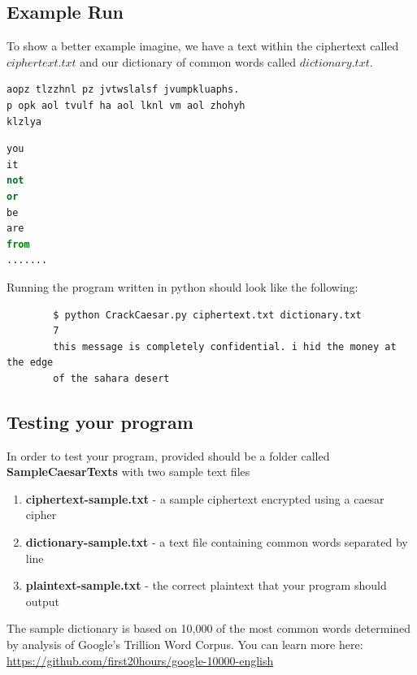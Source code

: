 \documentclass{article}
\begin{document}
\subsection{Example Run}
To show a better example imagine, we have a text within the ciphertext called $ciphertext.txt$ and our dictionary of common words called $dictionary.txt$.

\begin{file}
\begin{lstlisting}[language=Python]
aopz tlzzhnl pz jvtwslalsf jvumpkluaphs.
p opk aol tvulf ha aol lknl vm aol zhohyh
klzlya
\end{lstlisting}
\end{file}

\begin{file}
\begin{lstlisting}[language=Python]
you
it
not
or
be
are
from
.......
\end{lstlisting}
\end{file}

Running the program written in python should look like the following:

\begin{commandline}
	\begin{verbatim}
		$ python CrackCaesar.py ciphertext.txt dictionary.txt
		7
		this message is completely confidential. i hid the money at the edge
		of the sahara desert
	\end{verbatim}
\end{commandline}

\subsection{Testing your program}
In order to test your program, provided should be a folder called \textbf{SampleCaesarTexts} with two sample text files
\begin{enumerate}
\item \textbf{ciphertext-sample.txt} - a sample ciphertext encrypted using a caesar cipher
\item \textbf{dictionary-sample.txt} - a text file containing common words separated by line
\item \textbf{plaintext-sample.txt} - the correct plaintext that your program should output
\end{enumerate}

\begin{info}[Note:] %
The sample dictionary is based on 10,000 of the most common words determined by analysis of Google's Trillion Word Corpus. You can learn more here: \url{https://github.com/first20hours/google-10000-english}
\end{info}
\end{document}
